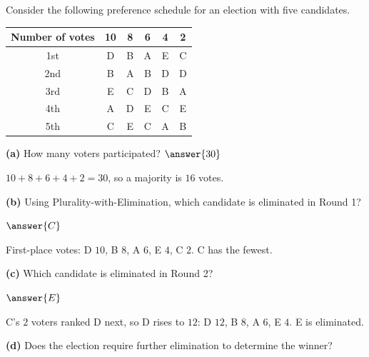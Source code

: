 \documentclass[12pt]{ximera}
\begin{document}
\begin{problem}
Consider the following preference schedule for an election with five candidates.

\begin{center}
\begin{tabular}{c|ccccc}
Number of votes & 10 & 8 & 6 & 4 & 2\\\hline
1st & D & B & A & E & C \\
2nd & B & A & B & D & D \\
3rd & E & C & D & B & A \\
4th & A & D & E & C & E \\
5th & C & E & C & A & B
\end{tabular}
\end{center}

\begin{prompt}
\textbf{(a)} How many voters participated? $\answer{30}$

\begin{feedback}
$10+8+6+4+2=30$, so a majority is $16$ votes.
\end{feedback}
\end{prompt}

\begin{prompt}
\textbf{(b)} Using Plurality-with-Elimination, which candidate is eliminated in Round 1?

$\answer{C}$

\begin{feedback}
First-place votes: D $10$, B $8$, A $6$, E $4$, C $2$. C has the fewest.
\end{feedback}
\end{prompt}

\begin{prompt}
\textbf{(c)} Which candidate is eliminated in Round 2?

$\answer{E}$

\begin{feedback}
C's $2$ voters ranked D next, so D rises to $12$: D $12$, B $8$, A $6$, E $4$. E is
eliminated.
\end{feedback}
\end{prompt}

\begin{prompt}
\textbf{(d)} Does the election require further elimination to determine the winner?

\begin{multipleChoice}
\end{multipleChoice}


\end{prompt}
\end{problem}
\end{document}
